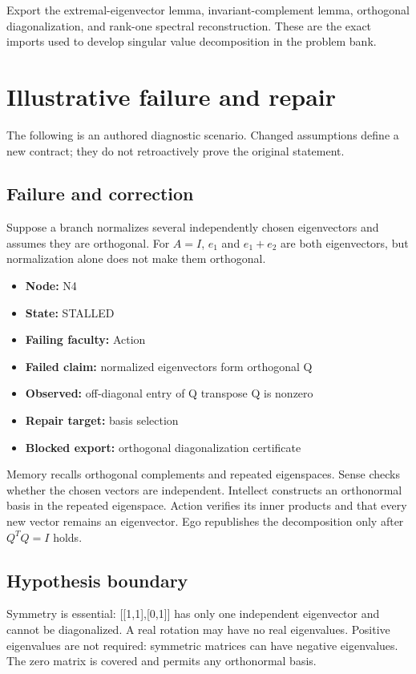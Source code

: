 \documentclass[preprint,12pt,aps,pra,showkeys,amsmath,amssymb,superscriptaddress,floatfix]{revtex4-2}
\theoremstyle{definition}
\theoremstyle{remark}
\begin{document}
Export the extremal-eigenvector lemma, invariant-complement lemma,
orthogonal diagonalization, and rank-one spectral reconstruction. These
are the exact imports used to develop singular value decomposition in
the problem bank.

\section{Illustrative failure and repair}

The following is an authored diagnostic scenario. Changed assumptions
define a new contract; they do not retroactively prove the original
statement.

\subsection{Failure and correction}
Suppose a branch normalizes several independently chosen eigenvectors
and assumes they are orthogonal. For \(A=I\), \(e_{1}\) and
\(e_{1}+e_{2}\) are both eigenvectors, but normalization alone does not
make them orthogonal.

\begin{itemize}
\item
  \textbf{Node:} N4
\item
  \textbf{State:} STALLED
\item
  \textbf{Failing faculty:} Action
\item
  \textbf{Failed claim:} normalized eigenvectors form orthogonal Q
\item
  \textbf{Observed:} off-diagonal entry of Q transpose Q is nonzero
\item
  \textbf{Repair target:} basis selection
\item
  \textbf{Blocked export:} orthogonal diagonalization certificate
\end{itemize}

Memory recalls orthogonal complements and repeated eigenspaces. Sense
checks whether the chosen vectors are independent. Intellect constructs
an orthonormal basis in the repeated eigenspace. Action verifies its
inner products and that every new vector remains an eigenvector. Ego
republishes the decomposition only after \(Q^{T}Q=I\) holds.

\subsection{Hypothesis boundary}
Symmetry is essential: {[}{[}1,1{]},{[}0,1{]}{]} has only one
independent eigenvector and cannot be diagonalized. A real rotation may
have no real eigenvalues. Positive eigenvalues are not required:
symmetric matrices can have negative eigenvalues. The zero matrix is
covered and permits any orthonormal basis.
\end{document}
